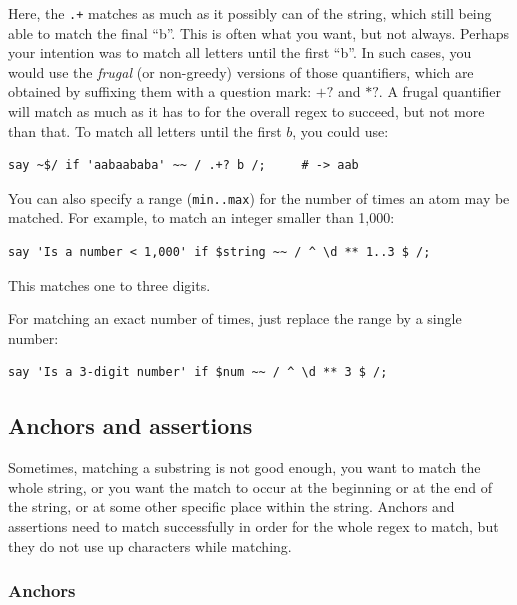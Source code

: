 Here, the \verb'.+' matches as much as it possibly can 
of the string, which still being able to match the final ``b''. 
This is often what you want, but not always. Perhaps your 
intention was to match all letters until the first ``b''. In 
such cases, you would use the \emph{frugal} (or non-greedy) 
versions of those quantifiers, which are obtained by suffixing 
them with a question mark: $+?$ and $*?$. A frugal quantifier 
will match as much as it has to for the overall regex to succeed, 
but not more than that. To match all letters until the first $b$, 
you could use:

\begin{verbatim}
say ~$/ if 'aabaababa' ~~ / .+? b /;     # -> aab
\end{verbatim}
%

You can also specify a range ({\tt min..max}) for the number of 
times an atom may be matched. For example, to match an 
integer smaller than 1,000:

\begin{verbatim}
say 'Is a number < 1,000' if $string ~~ / ^ \d ** 1..3 $ /;
\end{verbatim}
%

This matches one to three digits.

For matching an exact number of times, just replace the range by a single number:

\begin{verbatim}
say 'Is a 3-digit number' if $num ~~ / ^ \d ** 3 $ /;
\end{verbatim}
%

\subsection{Anchors and assertions}


Sometimes, matching a substring is not good enough, you  
want to match the whole string, or you want the match to occur 
at the beginning or at the end of the string, or at some 
other specific place within the string. Anchors and assertions need to match 
successfully in order for the whole regex to match, but they 
do not use up characters while matching.

\subsubsection{Anchors}

